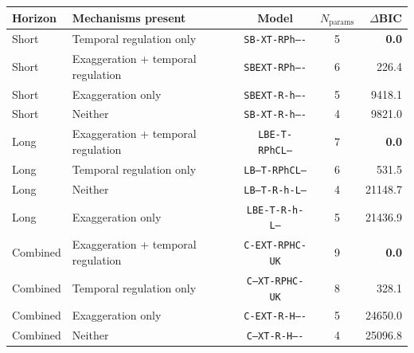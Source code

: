 \begin{tabular}{llccr}
\hline
\textbf{Horizon} & \textbf{Mechanisms present} & \textbf{Model} & \textbf{$N_{\text{params}}$} & \textbf{$\Delta$BIC} \\
\hline
Short & Temporal regulation only & \texttt{SB-XT-RPh----} & 5 & \textbf{0.0} \\
Short & Exaggeration + temporal regulation & \texttt{SBEXT-RPh----} & 6 & 226.4 \\
Short & Exaggeration only & \texttt{SBEXT-R-h----} & 5 & 9418.1 \\
Short & Neither & \texttt{SB-XT-R-h----} & 4 & 9821.0 \\
\hline
Long & Exaggeration + temporal regulation & \texttt{LBE-T-RPhCL--} & 7 & \textbf{0.0} \\
Long & Temporal regulation only & \texttt{LB--T-RPhCL--} & 6 & 531.5 \\
Long & Neither & \texttt{LB--T-R-h-L--} & 4 & 21148.7 \\
Long & Exaggeration only & \texttt{LBE-T-R-h-L--} & 5 & 21436.9 \\
\hline
Combined & Exaggeration + temporal regulation & \texttt{C-EXT-RPHC-UK} & 9 & \textbf{0.0} \\
Combined & Temporal regulation only & \texttt{C--XT-RPHC-UK} & 8 & 328.1 \\
Combined & Exaggeration only & \texttt{C-EXT-R-H----} & 5 & 24650.0 \\
Combined & Neither & \texttt{C--XT-R-H----} & 4 & 25096.8 \\
\hline
\end{tabular}
